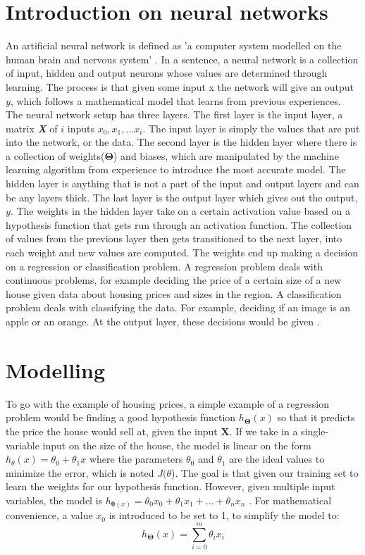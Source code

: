 \documentclass[a4paper,12pt]{article}
\begin{document}
\section{Introduction on neural networks}
An artificial neural network is defined as 'a computer system modelled on the human brain and nervous system' \cite{nndef}. In a sentence, a neural network is a collection of input, hidden and output neurons whose values are determined through learning. The process is that given some input x the network will give an output \(y\), which follows a mathematical model that learns from previous experiences. The neural network setup has three layers. The first layer is the input layer, a matrix \textbf{\emph{X}} of \(i\) inputs \(x_0,x_1,...x_i\). The input layer is simply the values that are put into the network, or the data. The second layer is the hidden layer where there is a collection of weights(\(\boldsymbol{\Theta}\)) and biases, which are manipulated by the machine learning algorithm from experience to introduce the most accurate model. The hidden layer is anything that is not a part of the input and output layers and can be any layers thick. The last layer is the output layer which gives out the output, \(y\). The weights in the hidden layer take on a certain activation value based on a hypothesis function that gets run through an activation function. The collection of values from the previous layer then gets transitioned to the next layer, into each weight and new values are computed. The weights end up making a decision on a regression or classification problem. A regression problem deals with continuous problems, for example deciding the price of a certain size of a new house given data about housing prices and sizes in the region. A classification problem deals with classifying the data. For example, deciding if an image is an apple or an orange. At the output layer, these decisions would be given \cite{patternml}.

\section{Modelling}
To go with the example of housing prices, a simple example of a regression problem would be finding a good hypothesis function \(h_{\boldsymbol{\Theta}}(x)\) so that it predicts the price the house would sell at, given the input $\boldsymbol{X}$. If we take in a single-variable input on the size of the house, the model is linear on the form  \(h_\theta(x) = \theta_0 + \theta_1x\) where the parameters \(\theta_0\) and \(\theta_1\) are the ideal values to minimize the error, which is noted \(J(\theta\)). The goal is that given our training set to learn the weights for our hypothesis function. However, given multiple input variables, the model is \(h_{\boldsymbol{\theta}(x)} = \theta_0x_0 + \theta_1x_1 + ... + \theta_nx_n\) \cite{patternml}. For mathematical convenience, a value $x_0$ is introduced to be set to 1, to simplify the model to:
\[h_{\boldsymbol{\Theta}}(x) = \sum_{i = 0}^m \theta_ix_i\]
\end{document}
